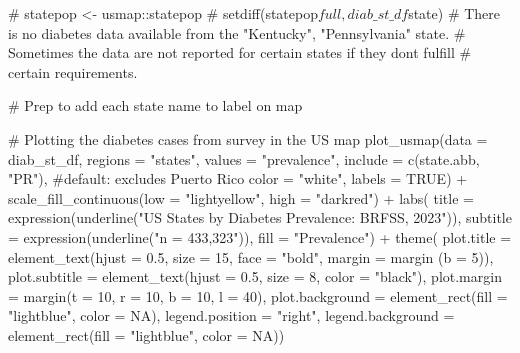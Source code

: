 \documentclass[
  letterpaper,
  DIV=11,
  numbers=noendperiod]{scrartcl}
\newenvironment{Shaded}{\begin{snugshade}}{\end{snugshade}}
\newcommand{\AttributeTok}[1]{\textcolor[rgb]{0.40,0.45,0.13}{#1}}
\newcommand{\CommentTok}[1]{\textcolor[rgb]{0.37,0.37,0.37}{#1}}
\newcommand{\ConstantTok}[1]{\textcolor[rgb]{0.56,0.35,0.01}{#1}}
\newcommand{\DecValTok}[1]{\textcolor[rgb]{0.68,0.00,0.00}{#1}}
\newcommand{\FloatTok}[1]{\textcolor[rgb]{0.68,0.00,0.00}{#1}}
\newcommand{\FunctionTok}[1]{\textcolor[rgb]{0.28,0.35,0.67}{#1}}
\newcommand{\NormalTok}[1]{\textcolor[rgb]{0.00,0.23,0.31}{#1}}
\newcommand{\SpecialCharTok}[1]{\textcolor[rgb]{0.37,0.37,0.37}{#1}}
\newcommand{\StringTok}[1]{\textcolor[rgb]{0.13,0.47,0.30}{#1}}
\begin{document}
\begin{Shaded}
\begin{Highlighting}[]
\CommentTok{\# statepop \textless{}{-} usmap::statepop}
\CommentTok{\# setdiff(statepop$full, diab\_st\_df$state)}
\CommentTok{\# There is no diabetes data available from the "Kentucky", "Pennsylvania" state.}
\CommentTok{\# Sometimes the data are not reported for certain states if they don\textquotesingle{}t fulfill }
\CommentTok{\# certain requirements.}

\CommentTok{\# Prep to add each state name to label on map}

\CommentTok{\# Plotting the diabetes cases from survey in the US map}
\FunctionTok{plot\_usmap}\NormalTok{(}\AttributeTok{data =}\NormalTok{ diab\_st\_df,}
           \AttributeTok{regions =} \StringTok{"states"}\NormalTok{,}
           \AttributeTok{values =} \StringTok{"prevalence"}\NormalTok{,}
           \AttributeTok{include =} \FunctionTok{c}\NormalTok{(state.abb, }\StringTok{"PR"}\NormalTok{), }\CommentTok{\#default: excludes Puerto Rico}
           \AttributeTok{color =} \StringTok{"white"}\NormalTok{,}
           \AttributeTok{labels =} \ConstantTok{TRUE}\NormalTok{) }\SpecialCharTok{+}  
  \FunctionTok{scale\_fill\_continuous}\NormalTok{(}\AttributeTok{low =} \StringTok{"lightyellow"}\NormalTok{, }\AttributeTok{high =} \StringTok{"darkred"}\NormalTok{) }\SpecialCharTok{+}
  \FunctionTok{labs}\NormalTok{(}
    \AttributeTok{title =} \FunctionTok{expression}\NormalTok{(}\FunctionTok{underline}\NormalTok{(}\StringTok{"US States by Diabetes Prevalence: BRFSS, 2023"}\NormalTok{)),}
    \AttributeTok{subtitle =} \FunctionTok{expression}\NormalTok{(}\FunctionTok{underline}\NormalTok{(}\StringTok{"n = 433,323"}\NormalTok{)),}
    \AttributeTok{fill =} \StringTok{"Prevalence"}\NormalTok{) }\SpecialCharTok{+}
  \FunctionTok{theme}\NormalTok{(}
    \AttributeTok{plot.title =} \FunctionTok{element\_text}\NormalTok{(}\AttributeTok{hjust =} \FloatTok{0.5}\NormalTok{, }\AttributeTok{size =} \DecValTok{15}\NormalTok{, }\AttributeTok{face =} \StringTok{"bold"}\NormalTok{,}
                              \AttributeTok{margin =} \FunctionTok{margin}\NormalTok{ (}\AttributeTok{b =} \DecValTok{5}\NormalTok{)),}
    \AttributeTok{plot.subtitle =} \FunctionTok{element\_text}\NormalTok{(}\AttributeTok{hjust =} \FloatTok{0.5}\NormalTok{,}
                                  \AttributeTok{size =} \DecValTok{8}\NormalTok{, }
                                 \AttributeTok{color =} \StringTok{"black"}\NormalTok{),}
    \AttributeTok{plot.margin =} \FunctionTok{margin}\NormalTok{(}\AttributeTok{t =} \DecValTok{10}\NormalTok{, }\AttributeTok{r =} \DecValTok{10}\NormalTok{, }\AttributeTok{b =} \DecValTok{10}\NormalTok{, }\AttributeTok{l =} \DecValTok{40}\NormalTok{),}
    \AttributeTok{plot.background =} \FunctionTok{element\_rect}\NormalTok{(}\AttributeTok{fill =} \StringTok{"lightblue"}\NormalTok{, }\AttributeTok{color =} \ConstantTok{NA}\NormalTok{),}
    \AttributeTok{legend.position =} \StringTok{"right"}\NormalTok{,}
    \AttributeTok{legend.background =} \FunctionTok{element\_rect}\NormalTok{(}\AttributeTok{fill =} \StringTok{"lightblue"}\NormalTok{, }\AttributeTok{color =} \ConstantTok{NA}\NormalTok{))}
\end{Highlighting}
\end{Shaded}
\end{document}
